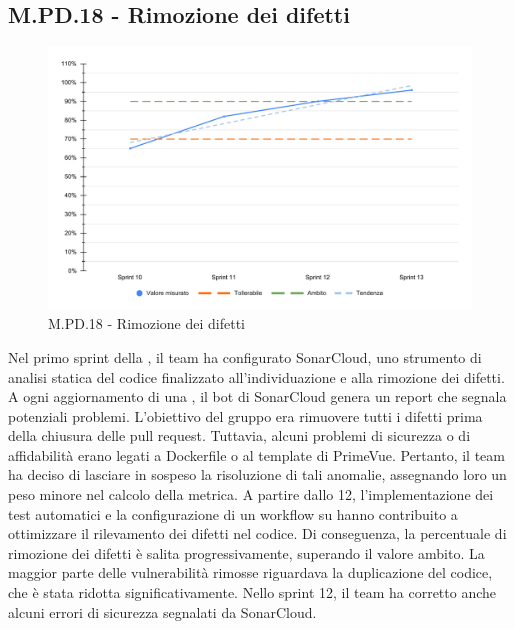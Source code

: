 \subsection{M.PD.18 - Rimozione dei difetti}

\begin{figure}[H]
  \centering
  \includegraphics[width=\textwidth]{assets/rimozione_difetti.pdf}
  \caption{M.PD.18 - Rimozione dei difetti}
\end{figure}

\par Nel primo sprint della , il team ha configurato SonarCloud, uno strumento di analisi statica del codice finalizzato all'individuazione e alla rimozione dei difetti. A ogni aggiornamento di una , il bot di SonarCloud genera un report che segnala potenziali problemi. L'obiettivo del gruppo era rimuovere tutti i difetti prima della chiusura delle pull request. Tuttavia, alcuni problemi di sicurezza o di affidabilità erano legati a Dockerfile o al template di PrimeVue. Pertanto, il team ha deciso di lasciare in sospeso la risoluzione di tali anomalie, assegnando loro un peso minore nel calcolo della metrica. A partire dallo  12, l'implementazione dei test automatici e la configurazione di un workflow su  hanno contribuito a ottimizzare il rilevamento dei difetti nel codice. Di conseguenza, la percentuale di rimozione dei difetti è salita progressivamente, superando il valore ambito. La maggior parte delle vulnerabilità rimosse riguardava la duplicazione del codice, che è stata ridotta significativamente. Nello sprint 12, il team ha corretto anche alcuni errori di sicurezza segnalati da SonarCloud.